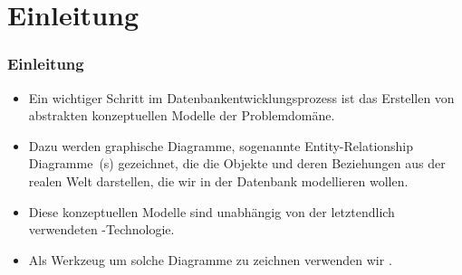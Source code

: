 \documentclass[aspectratio=169,mathserif,notheorems]{beamer}%
\subtitle{26.~yEd Installieren}%
\begin{document}
%
%
\startPresentation%
%
\section{Einleitung}%
%
\begin{frame}[b]%
\frametitle{Einleitung}%
\begin{itemize}%
\item Ein wichtiger Schritt im Datenbankentwicklungsprozess ist das Erstellen von abstrakten konzeptuellen Modelle der Problemdomäne.%
\item<2-> Dazu werden graphische Diagramme, sogenannte Entity-Relationship Diagramme~(s) gezeichnet, die die Objekte und deren Beziehungen aus der realen Welt darstellen, die wir in der Datenbank modellieren wollen.%
\item<3-> Diese konzeptuellen Modelle sind unabhängig von der letztendlich verwendeten -Technologie.%
\item<4-> Als Werkzeug um solche Diagramme zu zeichnen verwenden wir \yEd\cite{SG2015MDAWY,Y2011YGEM}.%
\end{itemize}%
%
\end{frame}%
%
\end{document}
